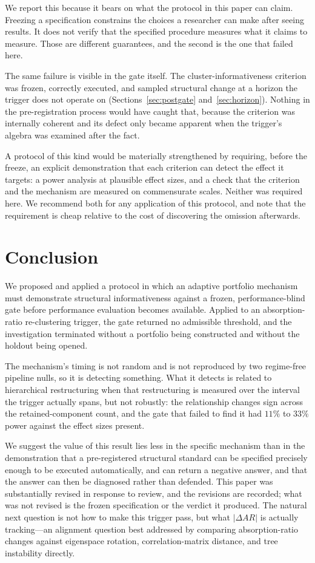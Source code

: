 \documentclass[12pt,letterpaper]{article}
\begin{document}
We report this because it bears on what the protocol in this paper can claim. Freezing a
specification constrains the choices a researcher can make after seeing results. It does
not verify that the specified procedure measures what it claims to measure. Those are
different guarantees, and the second is the one that failed here.

The same failure is visible in the gate itself. The cluster-informativeness criterion was
frozen, correctly executed, and sampled structural change at a horizon the trigger does
not operate on (Sections~\ref{sec:postgate} and~\ref{sec:horizon}). Nothing in the
pre-registration process would have caught that, because the criterion was internally
coherent and its defect only became apparent when the trigger's algebra was examined
after the fact.

A protocol of this kind would be materially strengthened by requiring, before the freeze,
an explicit demonstration that each criterion can detect the effect it targets: a power
analysis at plausible effect sizes, and a check that the criterion and the mechanism are
measured on commensurate scales. Neither was required here. We recommend both for any
application of this protocol, and note that the requirement is cheap relative to the cost
of discovering the omission afterwards.

\section{Conclusion}

We proposed and applied a protocol in which an adaptive portfolio mechanism must
demonstrate structural informativeness against a frozen, performance-blind gate before
performance evaluation becomes available. Applied to an absorption-ratio
re-clustering trigger, the gate returned no admissible threshold, and the
investigation terminated without a portfolio being constructed and without the holdout
being opened.

The mechanism's timing is not random and is not reproduced by two regime-free pipeline
nulls, so it is detecting something. What it detects is related to hierarchical
restructuring when that restructuring is measured over the interval the trigger actually
spans, but not robustly: the relationship changes sign across the retained-component
count, and the gate that failed to find it had $11\%$ to $33\%$ power against the effect
sizes present.

We suggest the value of this result lies less in the specific mechanism than in the
demonstration that a pre-registered structural standard can be specified precisely
enough to be executed automatically, and can return a negative answer, and that the answer can then be diagnosed rather than defended. This paper was substantially revised in response to review, and the revisions are recorded; what was not revised is the frozen specification or the verdict it produced. The natural next question is not how to
make this trigger pass, but what $|\Delta AR|$ is actually tracking---an alignment
question best addressed by comparing absorption-ratio changes against eigenspace
rotation, correlation-matrix distance, and tree instability directly.
\end{document}
